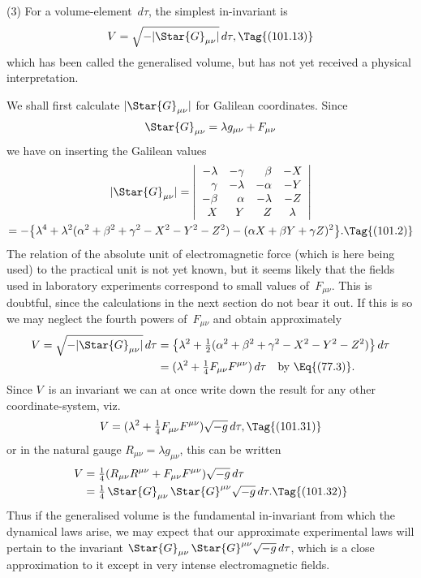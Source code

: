 \documentclass[12pt]{book}
\begin{document}
(3) For a volume-element~$d\tau$, the simplest in-invariant is
\[
V = \sqrt{-|\Star{G}_{\mu\nu}|}\, d\tau,
\Tag{(101.13)}
\]
which has been called the generalised volume, but has not yet received a
physical interpretation.

We shall first calculate $|\Star{G}_{\mu\nu}|$ for Galilean coordinates. Since
\[
\Star{G}_{\mu\nu} = \lambda g_{\mu\nu} + F_{\mu\nu}
\]
we have on inserting the Galilean values
\begin{multline*}
  |\Star{G}_{\mu\nu}|
  = \left\lvert
  \begin{array}{r@{\quad}r@{\quad}r@{\quad}c}
  -\lambda & -\gamma & \beta & -X \\
  \gamma & -\lambda & -\alpha & -Y \\
  -\beta & \alpha & -\lambda & -Z \\
  X & Y & Z & \lambda \\
  \end{array}\right\rvert \\
  = -\bigl\{\lambda^{4}
  + \lambda^{2}(\alpha^{2} + \beta^{2} + \gamma^{2} - X^{2} - Y^{2} - Z^{2})
  - (\alpha X + \beta Y + \gamma Z)^{2}\bigr\}.
  \Tag{(101.2)}
\end{multline*}
The relation of the absolute unit of electromagnetic force (which is here being
used) to the practical unit is not yet known, but it seems likely that the fields
used in laboratory experiments correspond to small values of~$F_{\mu\nu}$\footnotemark.\footnotetext
  {This is doubtful, since the calculations in the next section do not bear it out.}
If this is
so we may neglect the fourth powers of~$F_{\mu\nu}$ and obtain approximately
\begin{align*}
  V = \sqrt{-|\Star{G}_{\mu\nu}|}\, d\tau
  &= \bigl\{\lambda^{2} + \tfrac{1}{2}(\alpha^{2} + \beta^{2} + \gamma^{2} - X^{2} - Y^{2} - Z^{2})\bigr\}\, d\tau \\
  &= (\lambda^{2} + \tfrac{1}{4} F_{\mu\nu} F^{\mu\nu})\, d\tau
  \quad\text{by~\Eq{(77.3)}.}
\end{align*}
Since $V$~is an invariant we can at once write down the result for any other
coordinate-system, viz.\
\[
V = (\lambda^{2} + \tfrac{1}{4} F_{\mu\nu} F^{\mu\nu}) \sqrt{-g}\, d\tau,
\Tag{(101.31)}
\]
or in the natural gauge $R_{\mu\nu} = \lambda g_{\mu\nu}$, this can be written
\begin{align*}
V &= \tfrac{1}{4} (R_{\mu\nu} R^{\mu\nu} + F_{\mu\nu} F^{\mu\nu}) \sqrt{-g}\, d\tau \\
&= \tfrac{1}{4}\, \Star{G}_{\mu\nu}\, \Star{G}^{\mu\nu} \sqrt{-g}\, d\tau.
\Tag{(101.32)}
\end{align*}
Thus if the generalised volume is the fundamental in-invariant from which
the dynamical laws arise, we may expect that our approximate experimental
laws will pertain to the invariant $\Star{G}_{\mu\nu}\, \Star{G}^{\mu\nu} \sqrt{-g}\, d\tau$, which is a close approximation
to it except in very intense electromagnetic fields.
\end{document}

